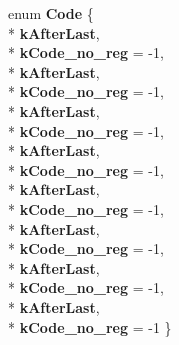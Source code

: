 \begin{DoxyCompactItemize}
\item 
enum {\bfseries Code} \{ \\*
{\bfseries k\+After\+Last}, 
\\*
{\bfseries k\+Code\+\_\+no\+\_\+reg} = -\/1, 
\\*
{\bfseries k\+After\+Last}, 
\\*
{\bfseries k\+Code\+\_\+no\+\_\+reg} = -\/1, 
\\*
{\bfseries k\+After\+Last}, 
\\*
{\bfseries k\+Code\+\_\+no\+\_\+reg} = -\/1, 
\\*
{\bfseries k\+After\+Last}, 
\\*
{\bfseries k\+Code\+\_\+no\+\_\+reg} = -\/1, 
\\*
{\bfseries k\+After\+Last}, 
\\*
{\bfseries k\+Code\+\_\+no\+\_\+reg} = -\/1, 
\\*
{\bfseries k\+After\+Last}, 
\\*
{\bfseries k\+Code\+\_\+no\+\_\+reg} = -\/1, 
\\*
{\bfseries k\+After\+Last}, 
\\*
{\bfseries k\+Code\+\_\+no\+\_\+reg} = -\/1, 
\\*
{\bfseries k\+After\+Last}, 
\\*
{\bfseries k\+Code\+\_\+no\+\_\+reg} = -\/1
 \}\hypertarget{structv8_1_1internal_1_1_double_register_a3bfd17e6e3d18cfe1c2fefe364430d19}{}\label{structv8_1_1internal_1_1_double_register_a3bfd17e6e3d18cfe1c2fefe364430d19}

\end{DoxyCompactItemize}
